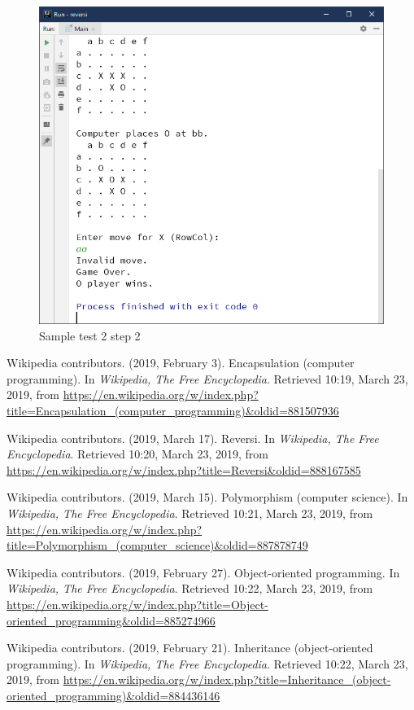 \documentclass[a4paper]{report}
\begin{document}
\begin{figure}
  \centering
  \includegraphics[width=12cm]{Capture5.png}
  \caption{Sample test 2 step 2}\label{6}
\end{figure}



\begin{thebibliography}{A}

Wikipedia contributors. (2019, February 3). Encapsulation (computer programming). In \emph{Wikipedia, The Free Encyclopedia}. Retrieved 10:19, March 23, 2019, from \url{https://en.wikipedia.org/w/index.php?title=Encapsulation_(computer_programming)&oldid=881507936}

Wikipedia contributors. (2019, March 17). Reversi. In \emph{Wikipedia, The Free Encyclopedia}. Retrieved 10:20, March 23, 2019, from \url{https://en.wikipedia.org/w/index.php?title=Reversi&oldid=888167585}

Wikipedia contributors. (2019, March 15). Polymorphism (computer science). In \emph{Wikipedia, The Free Encyclopedia}. Retrieved 10:21, March 23, 2019, from \url{https://en.wikipedia.org/w/index.php?title=Polymorphism_(computer_science)&oldid=887878749}

Wikipedia contributors. (2019, February 27). Object-oriented programming. In \emph{Wikipedia, The Free Encyclopedia}. Retrieved 10:22, March 23, 2019, from \url{https://en.wikipedia.org/w/index.php?title=Object-oriented_programming&oldid=885274966}

Wikipedia contributors. (2019, February 21). Inheritance (object-oriented programming). In \emph{Wikipedia, The Free Encyclopedia}. Retrieved 10:22, March 23, 2019, from \url{https://en.wikipedia.org/w/index.php?title=Inheritance_(object-oriented_programming)&oldid=884436146}

\end{thebibliography}
\end{document}

